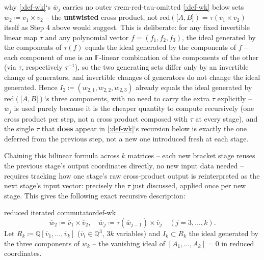 \documentclass[a4paper,11pt]{scrartcl}
\begin{document}
\begin{remark}{why \cref{:def-wk}`s \({\overline{w}}_{j}\) carries no outer \(\tau\)}{rem-red-tau-omitted} \cref{:def-wk} below sets \({\overline{w}}_{2} ≔ {\overline{v}}_{1} \times {\overline{v}}_{2}\) -- the \textbf{untwisted} cross product, not \(\text{red}\left( \lbrack A,B\rbrack \right) = \tau({\overline{v}}_{1} \times {\overline{v}}_{2})\) itself as Step 4 above would suggest. This is deliberate: for any fixed invertible linear map \(\tau\) and any polynomial vector \(f = \left( f_{1},f_{2},f_{3} \right)\), the ideal generated by the components of \(\tau(f)\) equals the ideal generated by the components of \(f\) -- each component of one is an \(\mathbb{F}\)-linear combination of the components of the other (via \(\tau\), respectively \(\tau^{- 1}\)), so the two generating sets differ only by an invertible change of generators, and invertible changes of generators do not change the ideal generated. Hence \(I_{2} ≔ \left( w_{2,1},w_{2,2},w_{2,3} \right)\) already equals the ideal generated by \(\text{red}\left( \lbrack A,B\rbrack \right)\)`s three components, with no need to carry the extra \(\tau\) explicitly -- \({\overline{w}}_{j}\) is used purely because it is the cheaper quantity to compute recursively (one cross product per step, not a cross product composed with \(\tau\) at every stage), and the single \(\tau\) that \textbf{does} appear in \cref{:def-wk}`s recursion below is exactly the one deferred from the previous step, not a new one introduced fresh at each stage.

\end{remark} \protect{}\label{rem-red-tau-omitted}{}

Chaining this bilinear formula across \(k\) matrices -- each new bracket stage reuses the previous stage's output coordinates directly, no new input data needed -- requires tracking how one stage's raw cross-product output is reinterpreted as the next stage's input vector: precisely the \(\tau\) just discussed, applied once per new stage. This gives the following exact recursive description:

\begin{definition}{reduced iterated commutator}{def-wk} \[{\overline{w}}_{2} ≔ {\overline{v}}_{1} \times {\overline{v}}_{2},\quad{\overline{w}}_{j} ≔ \tau({\overline{w}}_{j - 1}) \times {\overline{v}}_{j}\quad(j = 3,\ldots,k).\] Let \(R_{k} ≔ \mathbb{Q}\left\lbrack {\overline{v}}_{1},\ldots,{\overline{v}}_{k} \right\rbrack\) (\({\overline{v}}_{i} \in \mathbb{Q}^{3}\), \(3k\) variables) and \(I_{k} \subset R_{k}\) the ideal generated by the three components of \({\overline{w}}_{k}\) -- the vanishing ideal of \(\left\lbrack A_{1},\ldots,A_{k} \right\rbrack = 0\) in reduced coordinates.

\end{definition} \protect{}\label{def-wk}{}
\end{document}
